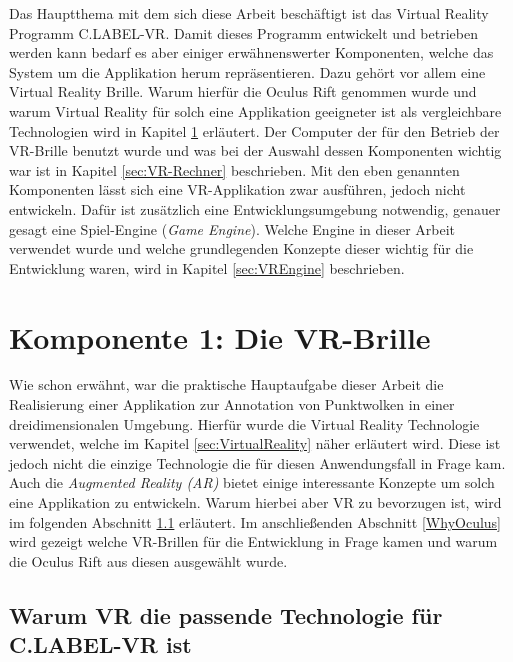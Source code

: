\graphicspath{{Kapitel/Kapitel3_Systembeschreibung/Images/}}

Das Hauptthema mit dem sich diese Arbeit beschäftigt ist das Virtual Reality Programm C.LABEL-VR. Damit dieses Programm entwickelt und betrieben werden kann bedarf es aber einiger erwähnenswerter Komponenten, welche das System um die Applikation herum repräsentieren. Dazu gehört vor allem eine Virtual Reality Brille. Warum hierfür die Oculus Rift genommen wurde und warum Virtual Reality für solch eine Applikation geeigneter ist als vergleichbare Technologien wird in Kapitel \ref{sec:VRBrille} erläutert. Der Computer der für den Betrieb der VR-Brille benutzt wurde und was bei der Auswahl dessen Komponenten wichtig war ist in Kapitel \ref{sec:VR-Rechner} beschrieben. Mit den eben genannten Komponenten lässt sich eine VR-Applikation zwar ausführen, jedoch nicht entwickeln. Dafür ist zusätzlich eine Entwicklungsumgebung notwendig, genauer gesagt eine Spiel-Engine (\textit{Game Engine}). Welche Engine in dieser Arbeit verwendet wurde und welche grundlegenden Konzepte dieser wichtig für die Entwicklung waren, wird in Kapitel \ref{sec:VREngine} beschrieben.

\section{Komponente 1: Die VR-Brille}
\label{sec:VRBrille}

Wie schon erwähnt, war die praktische Hauptaufgabe dieser Arbeit die Realisierung einer Applikation zur Annotation von Punktwolken in einer dreidimensionalen Umgebung. Hierfür wurde die Virtual Reality Technologie verwendet, welche im Kapitel \ref{sec:VirtualReality} näher erläutert wird. Diese ist jedoch nicht die einzige Technologie die für diesen Anwendungsfall in Frage kam. Auch die \textit{Augmented Reality (AR)} bietet einige interessante Konzepte um solch eine Applikation zu entwickeln. Warum hierbei aber VR zu bevorzugen ist, wird im folgenden Abschnitt \ref{sec:WhyVR} erläutert. Im anschließenden Abschnitt \ref{WhyOculus} wird gezeigt welche VR-Brillen für die Entwicklung in Frage kamen und warum die Oculus Rift aus diesen ausgewählt wurde.

\subsection{Warum VR die passende Technologie für C.LABEL-VR ist}
\label{sec:WhyVR}

